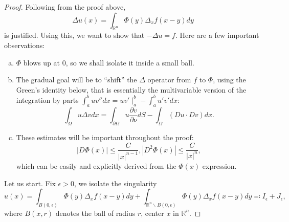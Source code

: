 \documentclass[openany, amssymb, psamsfonts]{amsart}
\theoremstyle{definition}
\numberwithin{equation}{section}
\newcommand{\bbr}{\mathbb{R}}
\begin{document}
\begin{proof}
    Following from the proof above, \[
    \Delta u(x) = \int_{\bbr^n} \Phi(y) \Delta_x f(x-y) dy
    \]
    is justified. Using this, we want to show that $- \Delta u = f$. Here are a few important observations:
    \begin{enumerate} [a)]
        \item $\Phi$ blows up at 0, so we shall isolate it inside a small ball.
        \item The gradual goal will be to ``shift'' the $\Delta$ operator from $f$ to $\Phi$, using the Green's identity below, that is essentially the multivariable version of the integration by parts $\int_{a}^{b} u v'' dx = uv'\mid_a^b - \int_{a}^{b} u'v' dx$:
        \begin{equation} \label{greendudv}
            \int_{\Omega} u \Delta v dx = \int_{\partial \Omega} u\dfrac{\partial v}{\partial \nu}dS - \int_{\Omega} (Du \cdot Dv) dx.
        \end{equation}
        \item These estimates will be important throughout the proof: \[
        |D\Phi (x)| \leq \dfrac{C}{|x|^{n-1}}, |D^2 \Phi(x)| \leq \dfrac{C}{|x|^n},
        \]
        which can be easily and explicitly derived from the $\Phi(x)$ expression.
    \end{enumerate}
    
    Let us start. Fix $\epsilon > 0$, we isolate the singularity
    \[
    u(x) = \int_{B(0, \epsilon)} \Phi(y) \Delta_x f(x - y)dy + \int_{\bbr^n \backslash B(0, \epsilon)} \Phi(y) \Delta_x f(x - y)dy \eqqcolon I_\epsilon + J_\epsilon ,
    \]
    where $B(x, r)$ denotes the ball of radius $r$, center $x$ in $\bbr^n$.


\end{proof}
\end{document}
